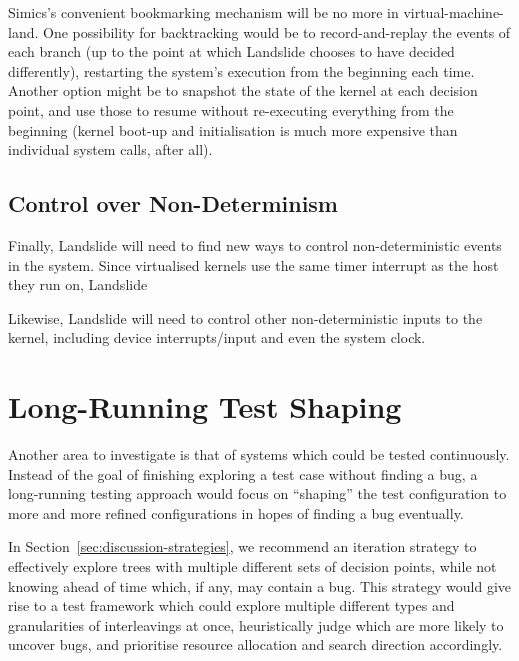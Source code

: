 Simics's convenient bookmarking mechanism will be no more in virtual-machine-land. One possibility for backtracking would be to record-and-replay the events of each branch (up to the point at which Landslide chooses to have decided differently), restarting the system's execution from the beginning each time. Another option might be to snapshot the state of the kernel at each decision point, and use those to resume without re-executing everything from the beginning (kernel boot-up and initialisation is much more expensive than individual system calls, after all).

\subsection{Control over Non-Determinism}

Finally, Landslide will need to find new ways to control non-deterministic events in the system. Since virtualised kernels use the same timer interrupt as the host they run on, Landslide 

Likewise, Landslide will need to control other non-deterministic inputs to the kernel, including device interrupts/input and even the system clock.

\section{Long-Running Test Shaping}
\label{sec:future-shaping}

Another area to investigate is that of systems which could be tested continuously. Instead of the goal of finishing exploring a test case without finding a bug, a long-running testing approach would focus on ``shaping'' the test configuration to more and more refined configurations in hopes of finding a bug eventually.

In Section~\ref{sec:discussion-strategies}, we recommend an iteration strategy to effectively explore trees with multiple different sets of decision points, while not knowing ahead of time which, if any, may contain a bug.
This strategy would give rise to a test framework which could explore multiple different types and granularities of interleavings at once, heuristically judge which are more likely to uncover bugs, and prioritise resource allocation and search direction accordingly.

